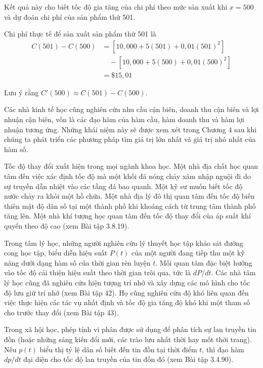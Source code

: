 \noindent
Kết quả này cho biết tốc độ gia tăng của chi phí theo mức sản xuất khi $x = 500$ và dự đoán chi phí của sản phẩm thứ 501.

\vspace{0.3em}
\noindent
Chi phí thực tế để sản xuất sản phẩm thứ 501 là
\begin{align*}
C(501) - C(500) &= [10{,}000 + 5(501) + 0{,}01(501)^2] \\
&\quad - [10{,}000 + 5(500) + 0{,}01(500)^2] \\
&= \$15{,}01
\end{align*}

\noindent
Lưu ý rằng $C'(500) \approx C(501) - C(500)$. \hfill \stewartsquare

\vspace{0.8em}
Các nhà kinh tế học cũng nghiên cứu nhu cầu cận biên, doanh thu cận biên và lợi nhuận cận biên, vốn là các đạo hàm của hàm cầu, hàm doanh thu và hàm lợi nhuận tương ứng. Những khái niệm này sẽ được xem xét trong Chương 4 sau khi chúng ta phát triển các phương pháp tìm giá trị lớn nhất và giá trị nhỏ nhất của hàm số.

Tốc độ thay đổi xuất hiện trong mọi ngành khoa học. Một nhà địa chất học quan tâm đến việc xác định tốc độ mà một khối đá nóng chảy xâm nhập nguội đi do sự truyền dẫn nhiệt vào các tầng đá bao quanh. Một kỹ sư muốn biết tốc độ nước chảy ra khỏi một hồ chứa. Một nhà địa lý đô thị quan tâm đến tốc độ biến thiên mật độ dân số tại một thành phố khi khoảng cách từ trung tâm thành phố tăng lên. Một nhà khí tượng học quan tâm đến tốc độ thay đổi của áp suất khí quyển theo độ cao (xem Bài tập 3.8.19).

Trong tâm lý học, những người nghiên cứu lý thuyết học tập khảo sát đường cong học tập, biểu diễn hiệu suất $P(t)$ của một người đang tiếp thu một kỹ năng dưới dạng hàm số của thời gian rèn luyện $t$. Mối quan tâm đặc biệt hướng vào tốc độ cải thiện hiệu suất theo thời gian trôi qua, tức là $dP/dt$. Các nhà tâm lý học cũng đã nghiên cứu hiện tượng trí nhớ và xây dựng các mô hình cho tốc độ lưu giữ trí nhớ (xem Bài tập 42). Họ cũng nghiên cứu độ khó liên quan đến việc thực hiện các tác vụ nhất định và tốc độ gia tăng độ khó khi một tham số cho trước thay đổi (xem Bài tập 43).

Trong xã hội học, phép tính vi phân được sử dụng để phân tích sự lan truyền tin đồn (hoặc những sáng kiến đổi mới, các trào lưu nhất thời hay mốt thời trang). Nếu $p(t)$ biểu thị tỷ lệ dân số biết đến tin đồn tại thời điểm $t$, thì đạo hàm $dp/dt$ đại diện cho tốc độ lan truyền của tin đồn đó (xem Bài tập 3.4.90).

